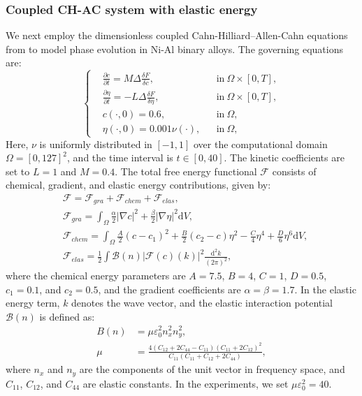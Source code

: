 \documentclass[11pt,reqno]{amsart}
\begin{document}
\subsubsection{Coupled CH-AC system with elastic energy}


We next employ the dimensionless coupled Cahn-Hilliard--Allen-Cahn equations from \cite{wang1995microstructural} to model phase evolution in Ni-Al binary alloys. The governing equations are:
\begin{equation}
\label{equ:phase_system}
\left\{
\begin{aligned}
&\frac{\partial c}{\partial t} = M\Delta \frac{\delta F}{\delta c}, &&\text{in}\ \Omega\times [0,T],\\
&\frac{\partial \eta}{\partial t} = -L\Delta \frac{\delta F}{\delta \eta},&&\text{in}\ \Omega\times [0,T],\\
&c(\cdot,0) = 0.6,&&\text{in}\ \Omega,\\
&\eta(\cdot,0) = 0.001\nu(\cdot),&&\text{in}\ \Omega,
\end{aligned}
\right.
\end{equation}
Here, $\nu$ is uniformly distributed in $[-1,1]$ over the computational domain $\Omega=[0,127]^2$, and the time interval is $t\in[0,40]$. The kinetic coefficients are set to $L=1$ and $M=0.4$. The total free energy functional $\mathcal{F}$ consists of chemical, gradient, and elastic energy contributions, given by:
\begin{align*}
&\mathcal{F} =\mathcal{F}_{gra}+\mathcal{F}_{chem}+\mathcal{F}_{elas},\\
&\mathcal{F}_{gra} = \int_\Omega \frac{\alpha}{2}|\nabla c|^2 + \frac{\beta}{2}|\nabla \eta|^2 \mathrm{d}V,\\
&\mathcal{F}_{chem} = \int_\Omega \frac{A}{2}(c-c_1)^2 + \frac{B}{2}(c_2-c)\eta^2 - \frac{C}{4}\eta^4 + \frac{D}{6}\eta^6 \mathrm{d}V,\\
&\mathcal{F}_{elas}= \frac{1}{2}\int \mathcal{B}(n) |\mathcal{F}(c)(k)|^2 \frac{\mathrm{d}^2k}{(2\pi)^2},
\end{align*}
where the chemical energy parameters are $A=7.5$, $B=4$, $C=1$, $D=0.5$, $c_1=0.1$, and $c_2=0.5$, and the gradient coefficients are $\alpha=\beta=1.7$. In the elastic energy term, $k$ denotes the wave vector, and the elastic interaction potential $\mathcal{B}(n)$ is defined as:
\begin{align*}
B(n) &= \mu\varepsilon_0^2 n_x^2n_y^2,\\
\mu &= \frac{4(C_{12}+2C_{44}-C_{11})(C_{11}+2C_{12})^2}{C_{11}(C_{11}+C_{12}+2C_{44})},
\end{align*}
where $n_x$ and $n_y$ are the components of the unit vector in frequency space, and $C_{11}$, $C_{12}$, and $C_{44}$ are elastic constants. In the experiments, we set $\mu\varepsilon_0^2=40$.
\end{document}
